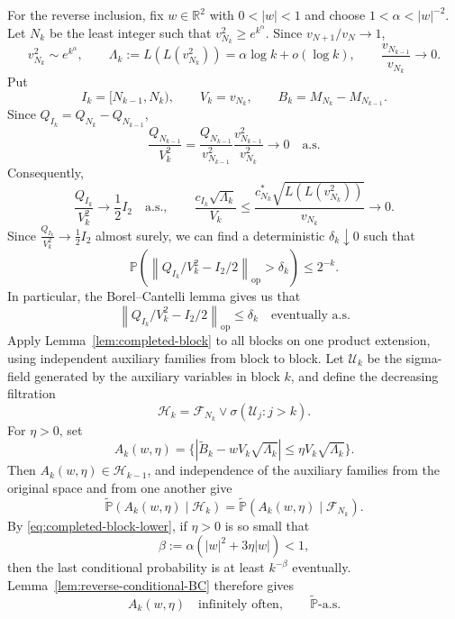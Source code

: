 \documentclass[12pt, reqno, final, a4paper]{amsart}
\theoremstyle{plain}
\theoremstyle{definition}
\theoremstyle{remark}
\newcommand{\1}{\mathbf 1}
\begin{document}
For the reverse inclusion, fix $w\in\mathbb R^2$ with $0<|w|<1$ and choose
$1<\alpha<|w|^{-2}$. Let $N_k$ be the least integer such that
$v_{N_k}^2\ge e^{k^\alpha}$. Since $v_{N+1}/v_N\to1$,
\[
 v_{N_k}^2\sim e^{k^\alpha},
 \qquad \Lambda_k:=L(L(v_{N_k}^2))=\alpha\log k+o(\log k),
 \qquad \frac{v_{N_{k-1}}}{v_{N_k}}\to0.
\]
Put
\[
 I_k=[N_{k-1},N_k),\qquad V_k=v_{N_k},\qquad
 B_k=M_{N_k}-M_{N_{k-1}}.
\]
Since $Q_{I_k}=Q_{N_k}-Q_{N_{k-1}}$,
\[
 \frac{Q_{N_{k-1}}}{V_k^2}
 =\frac{Q_{N_{k-1}}}{v_{N_{k-1}}^2}
  \frac{v_{N_{k-1}}^2}{v_{N_k}^2}\longrightarrow0
 \quad\text{a.s.}
\]
Consequently,
\[
 \frac{Q_{I_k}}{V_k^2}\longrightarrow\frac{1}{2}I_2\quad\text{a.s.},
 \qquad
 \frac{c_{I_k}\sqrt{\Lambda_k}}{V_k}
 \le\frac{c_{N_k}^*\sqrt{L(L(v_{N_k}^2))}}{v_{N_k}}
 \longrightarrow0.
\]
Since $\frac{Q_{I_k}}{V_k^2}\to \frac{1}{2}I_2$ almost surely, we can find a deterministic $\delta_k\downarrow 0$ such that
\[
\mathbb{P}(\left\|Q_{I_k}/V_k^2-I_2/2\right\|_{\mathrm{op}}>\delta_k)\leq 2^{-k}.
\]
In particular, the Borel--Cantelli lemma gives us that
\begin{equation}\label{eq:block-envelope}
 \left\|Q_{I_k}/V_k^2-I_2/2\right\|_{\mathrm{op}}\le\delta_k
 \quad\text{eventually a.s.}
\end{equation}
Apply Lemma~\ref{lem:completed-block} to all blocks on one product extension,
using independent auxiliary families from block to block. Let
$\mathcal U_k$ be the sigma-field generated by the auxiliary variables in
block $k$, and define the decreasing filtration
\[
 \mathcal H_k=\mathcal F_{N_k}\vee\sigma(\mathcal U_j:j>k).
\]
For $\eta>0$, set
\[
 A_k(w,\eta)=\{|\widetilde B_k-wV_k\sqrt{\Lambda_k}|
                   \le\eta V_k\sqrt{\Lambda_k}\}.
\]
Then $A_k(w,\eta)\in\mathcal H_{k-1}$, and independence of the auxiliary
families from the original space and from one another give
\[
 \widetilde{\mathbb P}(A_k(w,\eta)\mid\mathcal H_k)
 =\widetilde{\mathbb P}(A_k(w,\eta)\mid\mathcal F_{N_k}).
\]
By \eqref{eq:completed-block-lower}, if $\eta>0$ is so small that
\[
 \beta:=\alpha(|w|^2+3\eta|w|)<1,
\]
then the last conditional probability is at least $k^{-\beta}$ eventually.
Lemma~\ref{lem:reverse-conditional-BC} therefore gives
\begin{equation}\label{eq:augmented-hits-io}
 A_k(w,\eta)\quad\text{infinitely often},
 \qquad \widetilde{\mathbb P}\text{-a.s.}
\end{equation}
\end{document}
